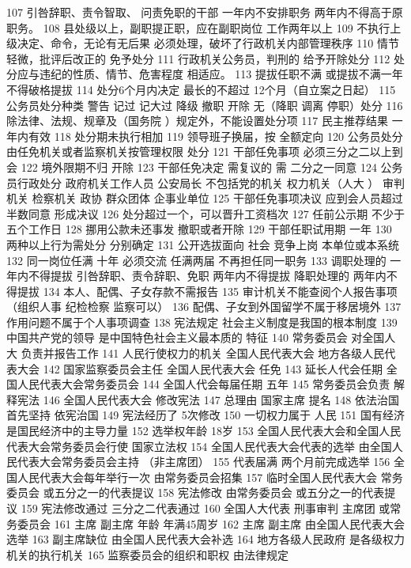 \documentclass[cyan]{elegantnote}
\begin{document}
107 引咎辞职、责令智取、 问责免职的干部
一年内不安排职务 两年内不得高于原职务。
108 县处级以上，副职提正职，应在副职岗位
工作两年以上
109 不执行上级决定、命令，无论有无后果
必须处理，破坏了行政机关内部管理秩序
110 情节轻微，批评后改正的
免予处分
111 行政机关公务员，判刑的
给予开除处分
112 处分应与违纪的性质、情节、危害程度 相适应。
113 提拔任职不满 或提拔不满一年 不得破格提拔
114 处分6个月内决定 最长的不超过
 12个月（自立案之日起）
115 公务员处分种类
警告 记过 记大过 降级 撤职 开除
无（降职 调离 停职）处分
116 除法律、法规、规章及（国务院 ）规定外，不能设置处分项
117 民主推荐结果 一年内有效
118 处分期未执行相加
119 领导班子换届，按
全额定向
120 公务员处分 由任免机关或者监察机关按管理权限 处分
121 干部任免事项
必须三分之二以上到会
122 境外限期不归
开除
123 干部任免决定 需复议的
需 二分之一同意
124 公务员行政处分
 政府机关工作人员 公安局长
不包括党的机关 权力机关（人大 ） 审判机关 检察机关 政协 群众团体 企事业单位
125 干部任免事项决议
应到会人员超过半数同意 形成决议
126 处分超过一个，可以晋升工资档次
127 任前公示期
不少于五个工作日
128 挪用公款未还事发
撤职或者开除
129 干部任职试用期
一年
130 两种以上行为需处分
分别确定
131 公开选拔面向 社会 竞争上岗 本单位或本系统
132 同一岗位任满
十年 必须交流 任满两届 不再担任同一职务
133 调职处理的 一年内不得提拔
引咎辞职、责令辞职、免职 两年内不得提拔
降职处理的 两年内不得提拔
134 本人、配偶、子女存款不需报告
135 审计机关不能查阅个人报告事项
（组织人事 纪检检察 监察可以）
136 配偶、子女到外国留学不属于移居境外
137 作用问题不属于个人事项调查
138 宪法规定 社会主义制度是我国的根本制度
139 中国共产党的领导 是中国特色社会主义最本质的 特征
140 常务委员会 对全国人大 负责并报告工作
141 人民行使权力的机关
全国人民代表大会 地方各级人民代表大会
142 国家监察委员会主任
全国人民代表大会 任免
143 延长人代会任期
全国人民代表大会常务委员会
144 全国人代会每届任期
 五年
145 常务委员会负责 解释宪法
146 全国人民代表大会 修改宪法
147 总理由 国家主席 提名
148 依法治国 首先坚持 依宪治国
149 宪法经历了
 5次修改
150 一切权力属于 人民
151 国有经济 是国民经济中的主导力量
152 选举权年龄
 18岁
153 全国人民代表大会和全国人民代表大会常务委员会行使 国家立法权
154 全国人民代表大会代表的选举
由全国人民代表大会常务委员会主持 （非主席团）
155 代表届满 两个月前完成选举
156 全国人民代表大会每年举行一次 由常务委员会招集
157 临时全国人民代表大会
常务委员会 或五分之一的代表提议
158 宪法修改
由常务委员会 或五分之一的代表提议
159 宪法修改通过
三分之二代表通过
160 全国人大代表 刑事审判
主席团 或常务委员会
161 主席 副主席 年龄
年满45周岁
162 主席 副主席
由全国人民代表大会选举
163 副主席缺位
由全国人民代表大会补选
164 地方各级人民政府 是各级权力机关的执行机关
165 监察委员会的组织和职权 由法律规定
\end{document}

